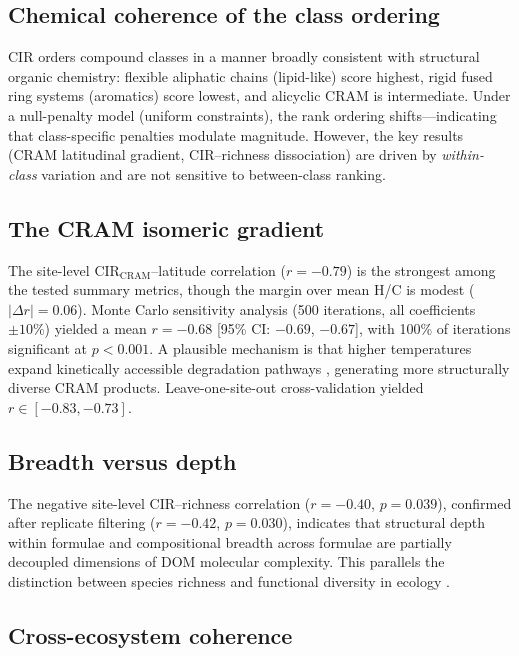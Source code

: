 \documentclass[12pt,letterpaper]{article}
\begin{document}
\subsection{Chemical coherence of the class ordering}

CIR orders compound classes in a manner broadly consistent with structural organic chemistry: flexible aliphatic chains (lipid-like) score highest, rigid fused ring systems (aromatics) score lowest, and alicyclic CRAM is intermediate. Under a null-penalty model (uniform constraints), the rank ordering shifts---indicating that class-specific penalties modulate magnitude. However, the key results (CRAM latitudinal gradient, CIR--richness dissociation) are driven by \emph{within-class} variation and are not sensitive to between-class ranking.

\subsection{The CRAM isomeric gradient}

The site-level CIR$_\text{CRAM}$--latitude correlation ($r = -0.79$) is the strongest among the tested summary metrics, though the margin over mean H/C is modest ($|\Delta r| = 0.06$). Monte Carlo sensitivity analysis (500 iterations, all coefficients $\pm 10\%$) yielded a mean $r = -0.68$ [95\% CI: $-0.69$, $-0.67$], with 100\% of iterations significant at $p < 0.001$. A plausible mechanism is that higher temperatures expand kinetically accessible degradation pathways \citep{larowe2011}, generating more structurally diverse CRAM products. Leave-one-site-out cross-validation yielded $r \in [-0.83, -0.73]$.

\subsection{Breadth versus depth}

The negative site-level CIR--richness correlation ($r = -0.40$, $p = 0.039$), confirmed after replicate filtering ($r = -0.42$, $p = 0.030$), indicates that structural depth within formulae and compositional breadth across formulae are partially decoupled dimensions of DOM molecular complexity. This parallels the distinction between species richness and functional diversity in ecology \citep{petchey2006}.

\subsection{Cross-ecosystem coherence}
\end{document}
